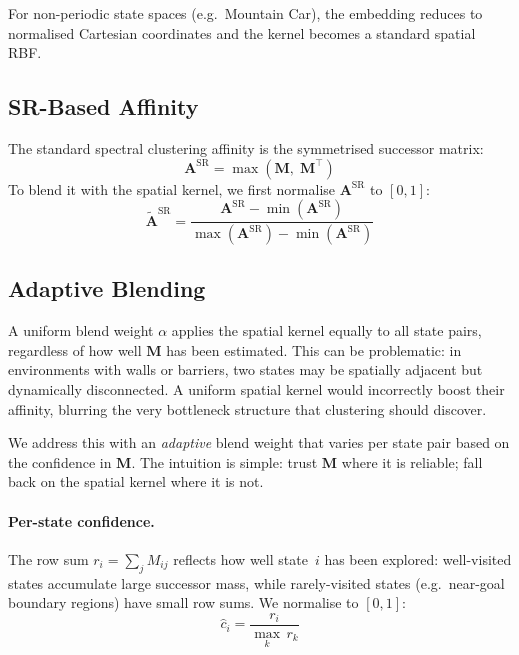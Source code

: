 \documentclass[11pt,a4paper]{article}
\begin{document}
For non-periodic state spaces (e.g.\ Mountain Car), the embedding reduces
to normalised Cartesian coordinates and the kernel becomes a standard
spatial RBF.

\subsection{SR-Based Affinity}

The standard spectral clustering affinity is the symmetrised successor
matrix:
\begin{equation}
\mathbf{A}^{\text{SR}} = \max\!\left(\mathbf{M},\;\mathbf{M}^\top\right)
\end{equation}
To blend it with the spatial kernel, we first normalise
$\mathbf{A}^{\text{SR}}$ to $[0, 1]$:
\begin{equation}
\widetilde{\mathbf{A}}^{\text{SR}} = \frac{\mathbf{A}^{\text{SR}} - \min\!\left(\mathbf{A}^{\text{SR}}\right)}{\max\!\left(\mathbf{A}^{\text{SR}}\right) - \min\!\left(\mathbf{A}^{\text{SR}}\right)}
\end{equation}

\subsection{Adaptive Blending}

A uniform blend weight $\alpha$ applies the spatial kernel equally to all
state pairs, regardless of how well $\mathbf{M}$ has been estimated.
This can be problematic: in environments with walls or barriers, two
states may be spatially adjacent but dynamically disconnected.  A uniform
spatial kernel would incorrectly boost their affinity, blurring the very
bottleneck structure that clustering should discover.

We address this with an \emph{adaptive} blend weight that varies per
state pair based on the confidence in $\mathbf{M}$.  The intuition is
simple: trust $\mathbf{M}$ where it is reliable; fall back on the spatial
kernel where it is not.

\paragraph{Per-state confidence.}
The row sum $r_i = \sum_j M_{ij}$ reflects how well state~$i$ has been
explored: well-visited states accumulate large successor mass, while
rarely-visited states (e.g.\ near-goal boundary regions) have small row
sums.  We normalise to $[0,1]$:
\begin{equation}
\hat{c}_i = \frac{r_i}{\max_k\, r_k}
\end{equation}
\end{document}
